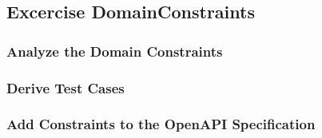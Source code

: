 \subsection{Excercise DomainConstraints}
\subsubsection*{Analyze the Domain Constraints}

\subsubsection*{Derive Test Cases}

\subsubsection*{Add Constraints to the OpenAPI Specification}